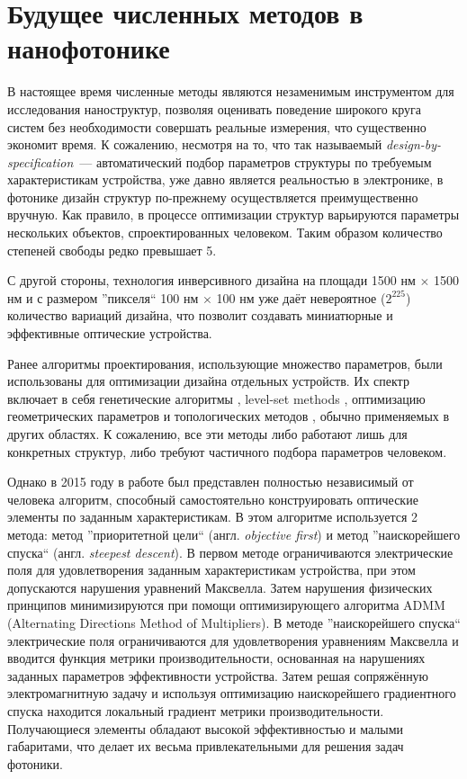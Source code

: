 \section{Будущее численных методов в нанофотонике}
\label{sec:numerical_methods}

В настоящее время численные методы являются незаменимым инструментом для исследования наноструктур, позволяя оценивать поведение широкого круга систем без необходимости совершать реальные измерения, что существенно экономит время. К сожалению, несмотря на то, что  так называемый {\it design-by-specification}~--- автоматический подбор параметров структуры по требуемым характеристикам устройства, уже давно является реальностью в электронике, в фотонике дизайн структур по-прежнему осуществляется преимущественно вручную. Как правило, в процессе оптимизации структур варьируются параметры нескольких объектов, спроектированных человеком. Таким образом количество степеней свободы редко превышает 5.

С другой стороны, технология инверсивного дизайна на площади 1500 нм $\times$ 1500 нм и с размером ''пикселя`` 100 нм $\times$ 100 нм уже даёт невероятное ($2^{225}$) количество вариаций дизайна, что позволит создавать миниатюрные и эффективные оптические устройства.

Ранее алгоритмы проектирования, использующие множество параметров, были использованы для оптимизации дизайна отдельных устройств. Их спектр включает в себя генетические алгоритмы \cite{Gondarenko2008}, level-set methods \cite{Kao2005}, оптимизацию геометрических параметров \cite{Seliger2006} и топологических методов \cite{Elesin2012}, обычно применяемых в других областях. К сожалению, все эти методы либо работают лишь для конкретных структур, либо требуют частичного подбора параметров человеком. 

Однако в 2015 году в работе \cite{Piggott2015} был представлен полностью независимый от человека алгоритм, способный самостоятельно конструировать оптические элементы по заданным характеристикам. В этом алгоритме используется 2 метода: метод ''приоритетной цели`` (англ. {\it objective first}) и метод ''наискорейшего спуска`` (англ. {\it steepest descent}). В первом методе ограничиваются электрические поля для удовлетворения заданным характеристикам устройства, при этом допускаются нарушения уравнений Максвелла. Затем нарушения физических принципов минимизируются при помощи оптимизирующего алгоритма ADMM (Alternating Directions Method of Multipliers). В методе ''наискорейшего спуска`` электрические поля ограничиваются для удовлетворения уравнениям Максвелла и вводится функция метрики производительности, основанная на нарушениях заданных параметров эффективности устройства. Затем решая сопряжённую электромагнитную задачу и используя оптимизацию наискорейшего градиентного спуска находится локальный градиент метрики производительности. Получающиеся элементы обладают высокой эффективностью и малыми габаритами, что делает их весьма привлекательными для решения задач фотоники.